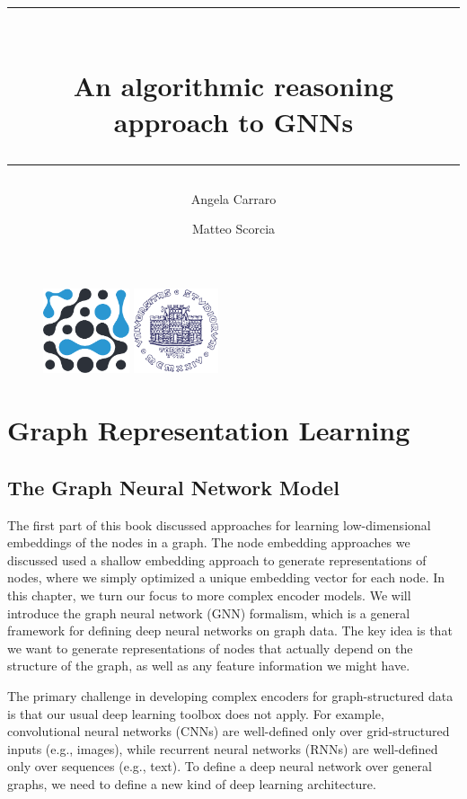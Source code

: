 \documentclass[10pt, onecolumn]{article}
\title{\rule{\textwidth}{0.4pt}\\\huge{An algorithmic reasoning\\approach to GNNs}\\\rule{\textwidth}{0.4pt}}
\author{\Large{Angela Carraro}}
\author{\Large{Matteo Scorcia}}
\affil{\Large{DSSC + IN20 - UniTS}}
\date{}
\begin{document}
\maketitle

\begin{figure}
    \centering
    \includegraphics[height=2.5cm]{figures/logo_dssc_alt.pdf}
    \hspace*{1cm}
    \includegraphics[height=2.5cm]{figures/Logo_units_blu.pdf}
\end{figure}

\newpage

\tableofcontents

\newpage

\section{Graph Representation Learning}

\subsection{The Graph Neural Network Model}

The first part of this book discussed approaches for learning low-dimensional embeddings of the nodes in a graph. The node embedding approaches we discussed used a shallow embedding approach to generate representations of nodes, where we simply optimized a unique embedding vector for each node. In this chapter, we turn our focus to more complex encoder models. We will introduce the graph neural network (GNN) formalism, which is a general framework for defining deep neural networks on graph data. The key idea is that we want to generate representations of nodes that actually depend on the structure of the graph, as well as any feature information we might have.

The primary challenge in developing complex encoders for graph-structured data is that our usual deep learning toolbox does not apply. For example, convolutional neural networks (CNNs) are well-defined only over grid-structured inputs (e.g., images), while recurrent neural networks (RNNs) are well-defined only over sequences (e.g., text). To define a deep neural network over general graphs, we need to define a new kind of deep learning architecture.
\end{document}
